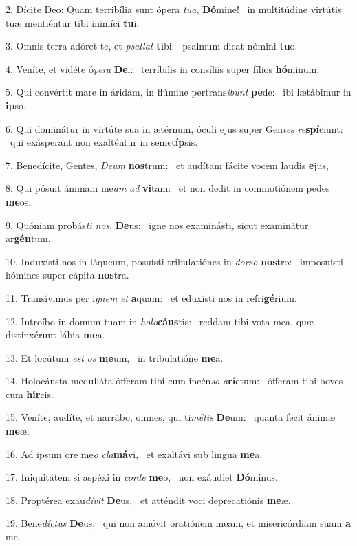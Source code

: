 2. Dícite Deo: Quam terribília sunt ópera \textit{tu}\textit{a}, \textbf{Dó}mine! \ast\  in multitúdine virtútis tuæ mentiéntur tibi inimíci \textbf{tu}i.\

3. Omnis terra adóret te, et \textit{psal}\textit{lat} \textbf{ti}bi: \ast\  psalmum dicat nómini \textbf{tu}o.\

4. Veníte, et vidéte ó\textit{pe}\textit{ra} \textbf{De}i: \ast\  terríbilis in consíliis super fílios \textbf{hó}minum.\

5. Qui convértit mare in áridam, in flúmine pertrans\textit{í}\textit{bunt} \textbf{pe}de: \ast\  ibi lætábimur in \textbf{ip}so.\

6. Qui dominátur in virtúte sua in ætérnum, óculi ejus super Gen\textit{tes} \textit{re}\textbf{spí}ciunt: \ast\  qui exásperant non exalténtur in semet\textbf{íp}sis.\

7. Benedícite, Gentes, \textit{De}\textit{um} \textbf{nos}trum: \ast\  et audítam fácite vocem laudis \textbf{e}jus,\

8. Qui pósuit ánimam me\textit{am} \textit{ad} \textbf{vi}tam: \ast\  et non dedit in commotiónem pedes \textbf{me}os.\

9. Quóniam probás\textit{ti} \textit{nos}, \textbf{De}us: \ast\  igne nos examinásti, sicut examinátur ar\textbf{gén}tum.\

10. Induxísti nos in láqueum, posuísti tribulatiónes in \textit{dor}\textit{so} \textbf{nos}tro: \ast\  imposuísti hómines super cápita \textbf{nos}tra.\

11. Transívimus per i\textit{gnem} \textit{et} \textbf{a}quam: \ast\  et eduxísti nos in refri\textbf{gé}rium.\

12. Introíbo in domum tuam in \textit{ho}\textit{lo}\textbf{cáus}tis: \ast\  reddam tibi vota mea, quæ distinxérunt lábia \textbf{me}a.\

13. Et locútum \textit{est} \textit{os} \textbf{me}um, \ast\  in tribulatióne \textbf{me}a.\

14. Holocáusta medulláta ófferam tibi cum incén\textit{so} \textit{a}\textbf{rí}etum: \ast\  ófferam tibi boves cum \textbf{hir}cis.\

15. Veníte, audíte, et narrábo, omnes, qui ti\textit{mé}\textit{tis} \textbf{De}um: \ast\  quanta fecit ánimæ \textbf{me}æ.\

16. Ad ipsum ore me\textit{o} \textit{cla}\textbf{má}vi, \ast\  et exaltávi sub lingua \textbf{me}a.\

17. Iniquitátem si aspéxi in \textit{cor}\textit{de} \textbf{me}o, \ast\  non exáudiet \textbf{Dó}minus.\

18. Proptérea exau\textit{dí}\textit{vit} \textbf{De}us, \ast\  et atténdit voci deprecatiónis \textbf{me}æ.\

19. Bene\textit{díc}\textit{tus} \textbf{De}us, \ast\  qui non amóvit oratiónem meam, et misericórdiam suam \textbf{a} me.\

